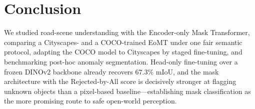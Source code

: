 \section{Conclusion}
\label{sec:conclusion}
We studied road-scene understanding with the Encoder-only Mask Transformer,
comparing a Cityscapes- and a COCO-trained EoMT under one fair semantic
protocol, adapting the COCO model to Cityscapes by staged fine-tuning, and
benchmarking post-hoc anomaly segmentation. Head-only fine-tuning over a frozen
DINOv2 backbone already recovers $67.3\%$ mIoU, and the mask architecture with
the Rejected-by-All score is decisively stronger at flagging unknown objects
than a pixel-based baseline---establishing mask classification as the more
promising route to safe open-world perception.
